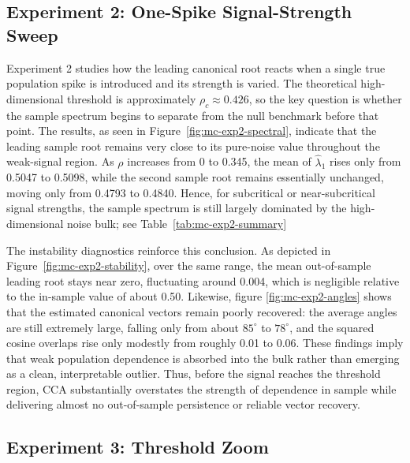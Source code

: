 \documentclass[12pt]{report} %
\begin{document}
\subsection*{Experiment 2: One-Spike Signal-Strength Sweep}

Experiment 2 studies how the leading canonical root reacts when a single true population spike is 
introduced and its strength is varied. The theoretical high-dimensional threshold is approximately 
$\rho_c \approx 0.426$, so the key question is whether the sample spectrum begins to separate from 
the null benchmark before that point. The results, as seen in Figure~\ref{fig:mc-exp2-spectral},
indicate that the leading sample root remains very close to its pure-noise value throughout the 
weak-signal region. As $\rho$ increases from 0 to 0.345, the mean of $\hat\lambda_1$ rises only from 
0.5047 to 0.5098, while the second sample root remains essentially unchanged, moving only from 
0.4793 to 0.4840. Hence, for subcritical or near-subcritical signal strengths, the sample spectrum 
is still largely dominated by the high-dimensional noise bulk; see Table~\ref{tab:mc-exp2-summary} 

The instability diagnostics reinforce this conclusion. As depicted in Figure~\ref{fig:mc-exp2-stability}, 
over the same range, the mean out-of-sample leading root stays near zero, fluctuating around 0.004, 
which is negligible relative to the in-sample value of about 0.50. Likewise, figure \ref{fig:mc-exp2-angles} 
shows that the estimated canonical vectors remain poorly recovered: the average angles are still extremely 
large, falling only from about $85^\circ$ to $78^\circ$, and the squared cosine overlaps rise 
only modestly from roughly 0.01 to 0.06. These findings imply that weak population dependence is 
absorbed into the bulk rather than emerging as a clean, interpretable outlier. Thus, before the signal 
reaches the threshold region, CCA substantially overstates the strength of dependence in sample while 
delivering almost no out-of-sample persistence or reliable vector recovery.

\subsection*{Experiment 3: Threshold Zoom}
\end{document}
